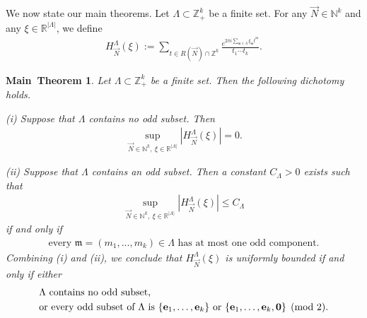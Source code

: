 \documentclass[11 pt,letterpaper]{amsart}
\theoremstyle{plain}
\newtheorem{main}{Main~Theorem}{}
\theoremstyle{definition}
\theoremstyle{remark} \theoremstyle{exam} \theoremstyle{ob}
\numberwithin{equation}{section}
\begin{document}
We now state our main  theorems. Let   $\Lambda\subset \mathbb{Z}_+^k$ be a finite set. For  any $\vec{N}\in \mathbb{N}^k$ and any $\xi\in \mathbb{R}^{|\Lambda|}$, we define
\begin{align}\label{hm11}
	H^{\Lambda}_{\vec{N}}(\xi):= \sum_{t\in  R(\vec{N})\cap \mathbb{Z}^k}\frac{  e^{2\pi i \sum_{\mathfrak{m}\in\Lambda} \xi_{\mathfrak{m}}t^\mathfrak{m}} }{t_1\cdots t_k}.
\end{align}
\begin{main}\label{mt1}
	Let $\Lambda\subset \mathbb{Z}_+^k$ be a finite set. Then the following dichotomy holds.
	
	\medskip
	\noindent
	{\rm (i)} Suppose that $\Lambda$ contains no odd subset. Then
	\begin{align}
		\sup_{\vec{N}\in \mathbb{N}^{k},\ \xi\in\mathbb{R}^{|\Lambda|}}
		|H^{\Lambda}_{\vec{N}}(\xi)|=0.
		\label{10099}
	\end{align}
	
	\medskip
	\noindent
	{\rm (ii)} Suppose that $\Lambda$ contains an odd subset. Then  a constant $C_{\Lambda}>0$ exists such that
	\begin{align*}
		\sup_{\vec{N}\in \mathbb{N}^{k},\ \xi\in\mathbb{R}^{|\Lambda|}}
		\left| H^{\Lambda}_{\vec{N}}(\xi)\right|
		\le C_{\Lambda}
	\end{align*}
	if and only if
	\begin{align}
		\text{every }\mathfrak{m}=(m_1,\dots,m_k)\in\Lambda
		\text{ has at most one odd component.}
		\label{1009}
	\end{align}
	Combining (i) and (ii),   we conclude that
	$H^{\Lambda}_{\vec N}(\xi)$
	is uniformly bounded if and only if either
	\begin{align*}
		&\text{$\Lambda$ contains no odd subset,}\\
		&\text{or every odd subset of }\Lambda\ \text{is}\ 
		\{{\bf e}_1,\dots,{\bf e}_k\}\ \text{or}\ \{{\bf e}_1,\dots,{\bf e}_k, {\bf 0}\}
		\pmod 2.
	\end{align*}
\end{main}
\end{document}
